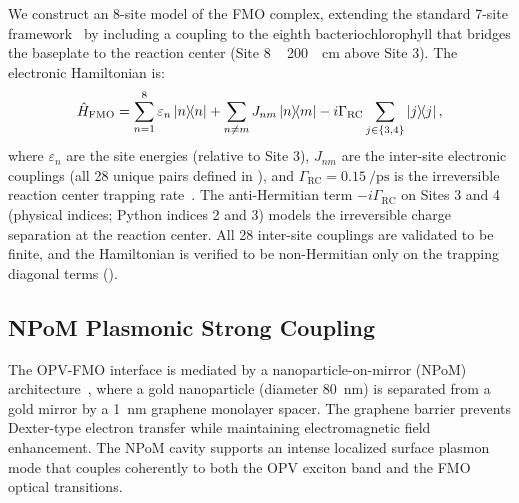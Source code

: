 \documentclass[12pt]{article}
\begin{document}
We construct an 8-site model of the FMO complex, extending the standard 7-site framework~\cite{Adolphs2006} by including a coupling to the eighth bacteriochlorophyll that bridges the baseplate to the reaction center (Site 8 ~ \SI{200}{\per\cm} above Site 3).
The electronic Hamiltonian is:
\begin{equation}
\hat{H}_{\mathrm{FMO}} = \sum_{n=1}^{8} \varepsilon_n \dyad{n} + \sum_{n \neq m} J_{nm} \dyad{n}{m} - i\Gamma_{\mathrm{RC}} \sum_{j \in \{3,4\}} \dyad{j}{j},
\label{eq:fmo_hamiltonian}
\end{equation}
where $\varepsilon_n$ are the site energies (relative to Site 3), $J_{nm}$ are the inter-site electronic couplings (all 28 unique pairs defined in ), and $\Gamma_{\mathrm{RC}} = \SI{0.15}{\per\ps}$ is the irreversible reaction center trapping rate~\cite{Renger2003}.
The anti-Hermitian term $-i\Gamma_{\mathrm{RC}}$ on Sites 3 and 4 (physical indices; Python indices 2 and 3) models the irreversible charge separation at the reaction center.
All 28 inter-site couplings are validated to be finite, and the Hamiltonian is verified to be non-Hermitian only on the trapping diagonal terms ().

\subsection*{NPoM Plasmonic Strong Coupling}

The OPV-FMO interface is mediated by a nanoparticle-on-mirror (NPoM) architecture~\cite{Chikkaraddy2016}, where a gold nanoparticle (diameter \SI{80}{\nm}) is separated from a gold mirror by a \SI{1}{\nm} graphene monolayer spacer.
The graphene barrier prevents Dexter-type electron transfer while maintaining electromagnetic field enhancement.
The NPoM cavity supports an intense localized surface plasmon mode that couples coherently to both the OPV exciton band and the FMO optical transitions.
\end{document}

